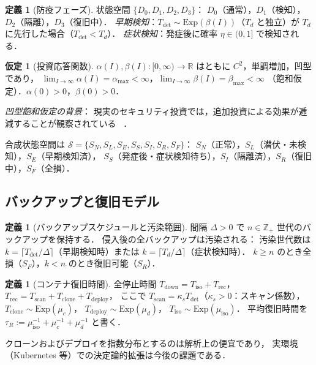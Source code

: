 \documentclass[12pt,a4paper]{article}
\theoremstyle{plain}
\theoremstyle{definition}
\newtheorem{definition}[theorem]{定義}
\newtheorem{assumption}[theorem]{仮定}
\theoremstyle{remark}
\newcommand{\Z}{\mathbb{Z}}
\newcommand{\Tdet}{T_{\mathrm{det}}}
\newcommand{\Trec}{T_{\mathrm{rec}}}
\newcommand{\Tdown}{T_{\mathrm{down}}}
\newcommand{\betaI}{\beta(I)}
\newcommand{\alphI}{\alpha(I)}
\begin{document}
\begin{definition}[防疫フェーズ]\label{def:defense}
状態空間 $\{D_0,D_1,D_2,D_3\}$：
$D_0$（通常），$D_1$（検知），$D_2$（隔離），$D_3$（復旧中）．
\emph{早期検知}：$\Tdet\sim\mathrm{Exp}(\betaI)$（$T_d$ と独立）が $T_d$ に先行した場合（$\Tdet<T_d$）．
\emph{症状検知}：発症後に確率 $\eta\in(0,1]$ で検知される．
\end{definition}

\begin{assumption}[投資応答関数]\label{ass:invest}
$\alphI,\betaI:[0,\infty)\to\mathbb{R}$ はともに $C^2$，単調増加，凹型であり，
$\lim_{I\to\infty}\alphI=\alpha_{\max}<\infty$，$\lim_{I\to\infty}\betaI=\beta_{\max}<\infty$
（飽和仮定）．$\alpha(0)>0$，$\beta(0)>0$．

\emph{凹型飽和仮定の背景}：
現実のセキュリティ投資では，追加投資による効果が逓減することが観察されている
~\cite{gordon2002,hausken2006,anderson2020}．
\end{assumption}

合成状態空間は $\mathcal{S}=\{S_N,S_L,S_E,S_S,S_I,S_R,S_F\}$：
$S_N$（正常），$S_L$（潜伏・未検知），$S_E$（早期検知済），
$S_S$（発症後・症状検知待ち），$S_I$（隔離済），$S_R$（復旧中），$S_F$（全損）．

\subsection{バックアップと復旧モデル}

\begin{definition}[バックアップスケジュールと汚染範囲]\label{def:backup}
間隔 $\Delta>0$ で $n\in\Z_+$ 世代のバックアップを保持する．
侵入後の全バックアップは汚染される：
汚染世代数は $k=\lceil\Tdet/\Delta\rceil$（早期検知時）または $k=\lceil T_d/\Delta\rceil$（症状検知時）．
$k\ge n$ のとき全損（$S_F$），$k<n$ のとき復旧可能（$S_R$）．
\end{definition}

\begin{definition}[コンテナ復旧時間]\label{def:recovery}
全停止時間 $\Tdown=T_{\mathrm{iso}}+\Trec$，
$\Trec=T_{\mathrm{scan}}+T_{\mathrm{clone}}+T_{\mathrm{deploy}}$，
ここで $T_{\mathrm{scan}}=\kappa_s\Tdet$（$\kappa_s>0$：スキャン係数），
$T_{\mathrm{clone}}\sim\mathrm{Exp}(\mu_c)$，
$T_{\mathrm{deploy}}\sim\mathrm{Exp}(\mu_d)$，
$T_{\mathrm{iso}}\sim\mathrm{Exp}(\mu_{\mathrm{iso}})$．
平均復旧時間を $\tau_R:=\mu_{\mathrm{iso}}^{-1}+\mu_c^{-1}+\mu_d^{-1}$ と書く．

クローンおよびデプロイを指数分布とするのは解析上の便宜であり，
実環境（Kubernetes 等）での決定論的拡張は今後の課題である．
\end{definition}
\end{document}
